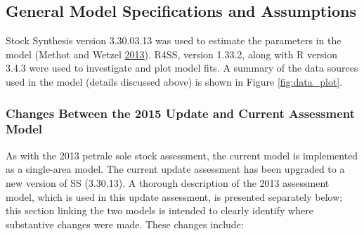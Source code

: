 \documentclass[12pt,]{article}
\begin{document}
\subsection{General Model Specifications and
Assumptions}\label{general-model-specifications-and-assumptions}

Stock Synthesis version 3.30.03.13 was used to estimate the parameters
in the model (Methot and Wetzel
\protect\hyperlink{ref-methot_stock_2013}{2013}). R4SS, version 1.33.2,
along with R version 3.4.3 were used to investigate and plot model fits.
A summary of the data sources used in the model (details discussed
above) is shown in Figure \ref{fig:data_plot}.

\subsubsection{Changes Between the 2015 Update and Current Assessment
Model}\label{changes-between-the-2015-update-and-current-assessment-model}

As with the 2013 petrale sole stock assessment, the current model is
implemented as a single-area model. The current update assessment has
been upgraded to a new version of SS (3.30.13). A thorough description
of the 2013 assessment model, which is used in this update assessment,
is presented separately below; this section linking the two models is
intended to clearly identify where substantive changes were made. These
changes include:
\end{document}
